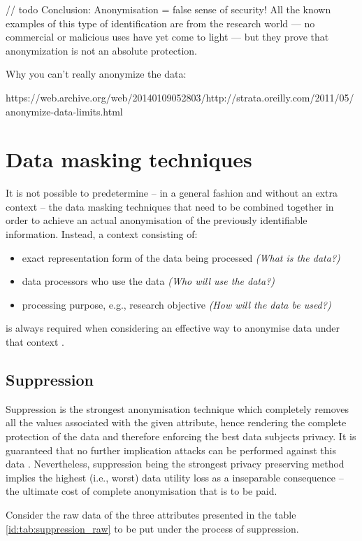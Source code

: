 \documentclass[a4paper,twoside,12pt]{book}
\begin{document}
// todo
Conclusion: Anonymisation = false sense of security! All the known examples of this type of identification are from the research world — no commercial or malicious uses have yet come to light — but they prove that anonymization is not an absolute protection.
\normalsize

Why you can't really anonymize the data:

https://web.archive.org/web/20140109052803/http://strata.oreilly.com/2011/05/anonymize-data-limits.html
\color{black}

\section{Data masking techniques}

It is not possible to predetermine – in a general fashion and without an extra context – the data masking techniques that need to be combined together in order to achieve an actual anonymisation of the previously identifiable information. Instead, a context consisting of:
\begin{itemize}
	\item exact representation form of the data being processed \textit{(What is the data?)}
	\item data processors who use the data \textit{(Who will use the data?)}
	\item processing purpose, e.g., research objective \textit{(How will the data be used?)}
\end{itemize}
is always required when considering an effective way to anonymise data under that context \cite{bib:anonymizing_health_data}.

\subsection{Suppression}

Suppression is the strongest anonymisation technique which completely removes all the values associated with the given attribute, hence rendering the complete protection of the data and therefore enforcing the best data subjects privacy. It is guaranteed that no further implication attacks can be performed against this data \cite{bib:anonymization_extensive_study}. Nevertheless, suppression being the strongest privacy preserving method implies the highest (i.e., worst) data utility loss as a inseparable consequence – the ultimate cost of complete anonymisation that is to be paid.

Consider the raw data of the three attributes presented in the table \ref{id:tab:suppression_raw} to be put under the process of suppression.
\end{document}
